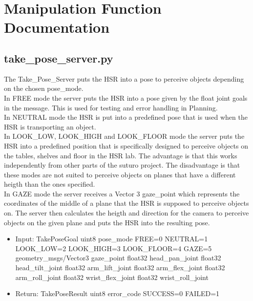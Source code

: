 \documentclass[main.tex]{subfiles}
\begin{document}
	\begingroup

	\renewcommand{\cleardoublepage}{}

	\renewcommand{\clearpage}{}

	\chapter{Manipulation Function Documentation}

		\chapterauthor{}
		

		\section{take\_pose\_server.py} 
		
		The Take\_Pose\_Server puts the HSR into a pose to perceive objects depending on the chosen pose\_mode. \\
		In FREE mode the server puts the HSR into a pose given by the float joint goals in the message. This is used for testing and error handling in Planning. \\
		In NEUTRAL mode the HSR is put into a predefined pose that is used when the HSR is transporting an object. \\
		In LOOK\_LOW, LOOK\_HIGH and LOOK\_FLOOR mode the server puts the HSR into a predefined position that is specifically designed to perceive objects on the tables, shelves and floor in the HSR lab. The advantage is that this works independently from other parts of the suturo project. The disadvantage is that these modes are not suited to perceive objects on planes that have a different heigth than the ones specified. \\
		In GAZE mode the server receives a Vector 3 gaze\_point which represents the coordinates of the middle of a plane that the HSR is supposed to perceive objects on. The server then calculates the heigth and direction for the camera to perceive objects on the given plane and puts the HSR into the resulting pose.
		
		\begin{itemize}
			\item Input: TakePoseGoal 
				\subitem uint8 pose\_mode
				    \subsubitem FREE=0
				    \subsubitem NEUTRAL=1
				    \subsubitem LOOK\_LOW=2
				    \subsubitem LOOK\_HIGH=3
				    \subsubitem LOOK\_FLOOR=4
				    \subsubitem GAZE=5
				\subitem geometry\_msgs/Vector3 gaze\_point
				\subitem float32 head\_pan\_joint
				\subitem float32 head\_tilt\_joint
				\subitem float32 arm\_lift\_joint
				\subitem float32 arm\_flex\_joint
				\subitem float32 arm\_roll\_joint
				\subitem float32 wrist\_flex\_joint
				\subitem float32 wrist\_roll\_joint
			\item Return: TakePoseResult
				\subitem uint8 error\_code 
				    \subsubitem SUCCESS=0
				    \subsubitem FAILED=1
		\end{itemize}
\end{document}
